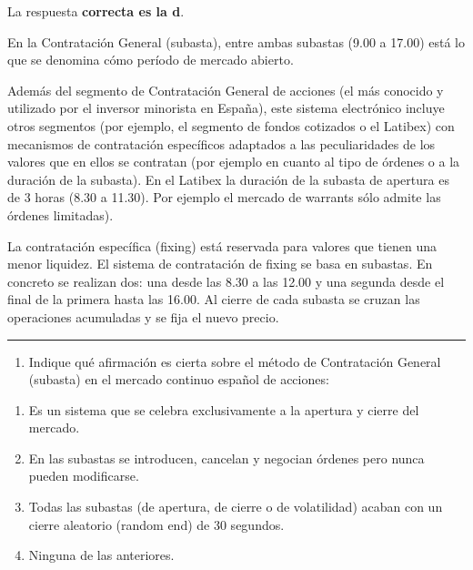 \documentclass[
  letterpaper,
  DIV=11,
  numbers=noendperiod]{scrreprt}
\providecommand{\tightlist}{%
  \setlength{\itemsep}{0pt}\setlength{\parskip}{0pt}}\usepackage{longtable,booktabs,array}
\begin{document}
\begin{tcolorbox}[enhanced jigsaw, left=2mm, opacityback=0, colback=white, breakable, arc=.35mm, bottomrule=.15mm, rightrule=.15mm, toprule=.15mm, leftrule=.75mm, colframe=quarto-callout-tip-color-frame]
\begin{minipage}[t]{5.5mm}
\textcolor{quarto-callout-tip-color}{\faLightbulb}
\end{minipage}%
\begin{minipage}[t]{\textwidth - 5.5mm}

La respuesta \textbf{correcta es la d}.

En la Contratación General (subasta), entre ambas subastas (9.00 a
17.00) está lo que se denomina cómo período de mercado abierto.

Además del segmento de Contratación General de acciones (el más conocido
y utilizado por el inversor minorista en España), este sistema
electrónico incluye otros segmentos (por ejemplo, el segmento de fondos
cotizados o el Latibex) con mecanismos de contratación específicos
adaptados a las peculiaridades de los valores que en ellos se contratan
(por ejemplo en cuanto al tipo de órdenes o a la duración de la
subasta). En el Latibex la duración de la subasta de apertura es de 3
horas (8.30 a 11.30). Por ejemplo el mercado de warrants sólo admite las
órdenes limitadas).

La contratación específica (fixing) está reservada para valores que
tienen una menor liquidez. El sistema de contratación de fixing se basa
en subastas. En concreto se realizan dos: una desde las 8.30 a las 12.00
y una segunda desde el final de la primera hasta las 16.00. Al cierre de
cada subasta se cruzan las operaciones acumuladas y se fija el nuevo
precio.

\end{minipage}%
\end{tcolorbox}

\begin{center}\rule{0.5\linewidth}{0.5pt}\end{center}

\begin{enumerate}
\def\labelenumi{\arabic{enumi}.}
\setcounter{enumi}{14}
\tightlist
\item
  Indique qué afirmación es cierta sobre el método de Contratación
  General (subasta) en el mercado continuo español de acciones:
\end{enumerate}

\begin{enumerate}
\def\labelenumi{\alph{enumi})}
\item
  Es un sistema que se celebra exclusivamente a la apertura y cierre del
  mercado.
\item
  En las subastas se introducen, cancelan y negocian órdenes pero nunca
  pueden modificarse.
\item
  Todas las subastas (de apertura, de cierre o de volatilidad) acaban
  con un cierre aleatorio (random end) de 30 segundos.
\item
  Ninguna de las anteriores.
\end{enumerate}
\end{document}
